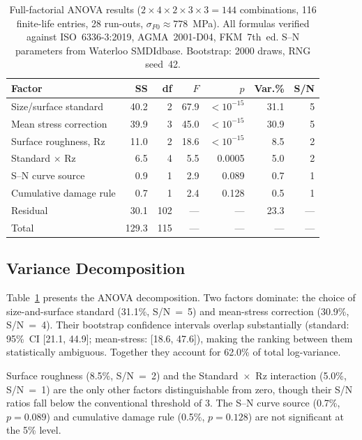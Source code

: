 \documentclass[12pt,a4paper]{article}
\begin{document}
\begin{table}[h]
\centering
\caption{Full-factorial ANOVA results ($2\times4\times2\times3\times3 =
144$ combinations, 116 finite-life entries, 28 run-outs,
$\sigma_{F0}\approx778$~MPa). All formulas verified against
ISO~6336-3:2019, AGMA~2001-D04, FKM~7th~ed. S--N parameters from
Waterloo SMDIdbase. Bootstrap: 2000 draws, RNG seed~42.}
\label{tab:anova}
\begin{tabular}{lrrrrrr}
\toprule
Factor & SS & df & $F$ & $p$ & Var.\% & S/N \\
\midrule
Size/surface standard & 40.2 & 2 & 67.9 & $<10^{-15}$ & 31.1 & 5 \\
Mean stress correction & 39.9 & 3 & 45.0 & $<10^{-15}$ & 30.9 & 5 \\
Surface roughness, Rz & 11.0 & 2 & 18.6 & $<10^{-15}$ & 8.5 & 2 \\
Standard $\times$ Rz & 6.5 & 4 & 5.5 & 0.0005 & 5.0 & 2 \\
S--N curve source & 0.9 & 1 & 2.9 & 0.089 & 0.7 & 1 \\
Cumulative damage rule & 0.7 & 1 & 2.4 & 0.128 & 0.5 & 1 \\
\midrule
Residual & 30.1 & 102 & --- & --- & 23.3 & --- \\
Total & 129.3 & 115 & --- & --- & --- & --- \\
\bottomrule
\end{tabular}
\end{table}

\subsection{Variance Decomposition}

Table~\ref{tab:anova} presents the ANOVA decomposition. Two factors
dominate: the choice of size-and-surface standard (31.1\%, S/N~=~5)
and mean-stress correction (30.9\%, S/N~=~4). Their bootstrap
confidence intervals overlap substantially (standard: 95\%~CI
[21.1, 44.9]; mean-stress: [18.6, 47.6]), making the ranking between
them statistically ambiguous. Together they account for 62.0\% of
total log-variance.

Surface roughness (8.5\%, S/N~=~2) and the Standard~$\times$~Rz
interaction (5.0\%, S/N~=~1) are the only other factors distinguishable
from zero, though their S/N ratios fall below the conventional
threshold of 3. The S--N curve source (0.7\%, $p=0.089$) and cumulative
damage rule (0.5\%, $p=0.128$) are not significant at the 5\% level.
\end{document}
